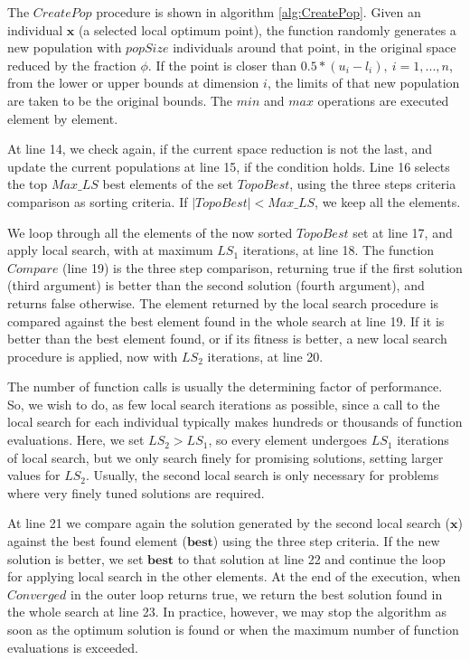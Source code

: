 


The $CreatePop$ procedure is shown in algorithm \ref{alg:CreatePop}. Given an individual $\bm{x}$ (a selected local optimum point), the function randomly generates a new population with $popSize$ individuals around that point, in the original space reduced by the fraction $\phi$. If the point is closer than $0.5 * (u_i - l_i), \ i = 1, ..., n$, from the lower or upper bounds at dimension $i$, the limits of that new population are taken to be the original bounds. The $min$ and $max$ operations are executed element by element.


At line 14, we check again, if the current space reduction is not the last, and update the current populations at line 15, if the condition holds. Line 16 selects the top $Max\_LS$ best elements of the set $TopoBest$, using the three steps criteria comparison as sorting criteria. If $|TopoBest| < Max\_LS$, we keep all the elements.

We loop through all the elements of the now sorted $TopoBest$ set at line 17, and apply local search, with at maximum $LS_1$ iterations, at line 18. The function $Compare$ (line 19) is the three step comparison, returning true if the first solution (third argument) is better than the second solution (fourth argument), and returns false otherwise. The element returned by the local search procedure is compared against the best element found in the whole search at line 19. If it is better than the best element found, or if its fitness is better, a new local search procedure is applied, now with $LS_2$ iterations, at line 20.


The number of function calls is usually the determining factor of performance. So, we wish to do, as few local search iterations as possible, since a call to the local search for each individual typically makes hundreds or thousands of function evaluations. Here, we set $LS_2 > LS_1$, so every element undergoes $LS_1$ iterations of local search, but we only search finely for promising solutions, setting larger values for $LS_2$. Usually, the second local search is only necessary for problems where very finely tuned solutions are required.

At line 21 we compare again the solution generated by the second local search ($\bm{x}$) against the best found element ($\bm{best}$) using the three step criteria. If the new solution is better, we set $\bm{best}$ to that solution at line 22 and continue the loop for applying local search in the other elements. At the end of the execution, when $Converged$ in the outer loop returns true, we return the best solution found in the whole search at line 23. In practice, however, we 
may stop the algorithm as soon as the optimum solution is found or when the maximum number of function evaluations is exceeded.

